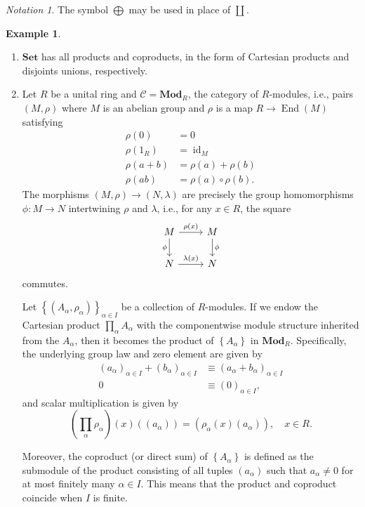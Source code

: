 \documentclass[10pt,letterpaper,cm]{nupset}
\theoremstyle{definition}
\newtheorem{exmp}[definition]{Example}
\theoremstyle{theorem}
\theoremstyle{remark}
\newtheorem*{notation}{Notation}
\newcommand{\1}{\mathbf{1}}
\renewcommand{\c}{\mathscr{C}}
\newcommand{\0}{\vec 0}
\DeclareMathOperator{\id}{\mathrm{id}}
\DeclareMathOperator{\ed}{End}
\begin{document}
 \begin{notation}
 The symbol $\bigoplus$ may be used in place of $\coprod$.
 \end{notation}


\begin{exmp} $ $
\begin{enumerate}
\item $\mathbf{Set}$ has all products and coproducts, in the form of Cartesian products and disjoints unions, respectively.
\item Let $R$ be a unital ring and $\c = \mathbf{Mod}_R$, the category of $R$-modules, i.e., pairs $\left(M, \rho\right)$ where $M$ is an abelian group and $\rho$ is a map $R \to \ed(M)$ satisfying 
\begin{align*}  \rho(0) &= 0  \\  \rho(1_R) &= \id_M \\   \rho(a +b) &= \rho(a) + \rho(b)  \\  \rho(ab) &= \rho(a) \circ \rho(b). \end{align*} The morphisms $\left(M, \rho\right) \to \left(N, \lambda\right)$ are precisely the group homomorphisms $\phi : M \to N$ intertwining $\rho$ and $\lambda$, i.e., for any $x \in R$, the square
\[
\begin{tikzcd}
M \arrow[d, "\phi"'] \arrow[r, "\rho(x)"] & M \arrow[d, "\phi"] \\
N \arrow[r, "\lambda(x)"] & N
\end{tikzcd}
\] commutes.

Let $\left\{\left(A_{\alpha}, \rho_{\alpha}\right)\right\}_{\alpha \in I}$ be a collection of $R$-modules. If we endow the Cartesian product $\prod_{\alpha} A_{\alpha}$ with the componentwise module structure inherited from the $A_{\alpha}$, then it becomes the product of $\left\{A_{\alpha}\right\}$ in $\mathbf{Mod}_R$. Specifically, the underlying group law and zero element are given by 
\begin{align*}
\left(a_{\alpha}\right)_{\alpha \in I} + \left(b_{\alpha}\right)_{\alpha \in I} & \equiv \left(a_{\alpha} + b_{\alpha}\right)_{\alpha \in I}
\\  0&  \equiv \left(0\right)_{\alpha \in I}
,\end{align*} and scalar multiplication is given by
\[
\left(\prod_{\alpha} \rho_{\alpha}\right)(x)\left(\left(a_{\alpha}\right)\right)=\left(\rho_{\alpha}(x)\left(a_{\alpha}\right)\right), \quad x\in R
.\] 

Moreover, the coproduct (or direct sum) of $\left\{A_{\alpha}\right\}$ is defined as the submodule of the product consisting of all tuples $\left(a_{\alpha}\right)$ such that $a_{\alpha} \ne 0$ for at most finitely many $\alpha \in I$. This means that the product and coproduct coincide when $I$ is finite.


\end{enumerate}
\end{exmp}
\end{document}
